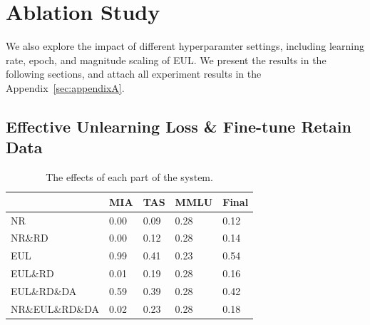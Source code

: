 \documentclass[11pt]{article}
\begin{document}


\section{Ablation Study}
\label{sec:Ablation}


We also explore the impact of different hyperparamter settings, including learning rate, epoch, and magnitude scaling of EUL. We present the results in the following sections, and attach all experiment results in the Appendix~\ref{sec:appendixA}.
\iffalse
\subsection{Effective Unlearning Loss \& Fine-tune Retain Data} 

\begin{table}\footnotesize
  \centering
    \begin{tabular}{l|l|l|l|l}
    \hline
        ~ & MIA & TAS & MMLU & Final \\ \hline
        NR & 0.00 & 0.09 & 0.28 & 0.12 \\ \hline
        NR\&RD & 0.00 & 0.12 & 0.28 & 0.14 \\ \hline
        EUL & 0.99 & 0.41 & 0.23 & 0.54 \\ \hline
        EUL\&RD & 0.01 & 0.19 & 0.28 & 0.16 \\ \hline
        EUL\&RD\&DA & 0.59 & 0.39 & 0.28 & 0.42 \\ \hline
        NR\&EUL\&RD\&DA & 0.02 & 0.23 & 0.28 & 0.18 \\ \hline
    \end{tabular}
  \caption{The effects of each part of the system.}
  \label{tab:accents}
\end{table}
\end{document}
